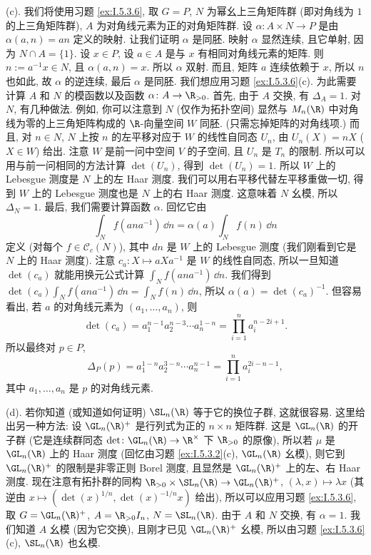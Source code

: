 \begin{solution}
(c). 我们将使用习题 \ref{ex:I.5.3.6}, 取 $G = P$, $N$ 为幂幺上三角矩阵群 (即对角线为 $1$ 的上三角矩阵群), $A$ 为对角线元素为正的对角矩阵群. 设 $\alpha \colon A \times N \to P$ 是由 $\alpha(a, n) = an$ 定义的映射. 让我们证明 $\alpha$ 是同胚. 映射 $\alpha$ 显然连续, 且它单射, 因为 $N \cap A = \{1\}$. 设 $x \in P$, 设 $a \in A$ 是与 $x$ 有相同对角线元素的矩阵. 则 $n := a^{-1}x \in N$, 且 $\alpha(a, n) = x$. 所以 $\alpha$ 双射. 而且, 矩阵 $a$ 连续依赖于 $x$, 所以 $n$ 也如此, 故 $\alpha$ 的逆连续, 最后 $\alpha$ 是同胚.
我们想应用习题 \ref{ex:I.5.3.6}(c). 为此需要计算 $A$ 和 $N$ 的模函数以及函数 $\alpha \colon A \to \R_{>0}$.
首先, 由于 $A$ 交换, 有 $\Delta_A = 1$.
对 $N$, 有几种做法. 例如, 你可以注意到 $N$ (仅作为拓扑空间) 显然与 $M_n(\R)$ 中对角线为零的上三角矩阵构成的 $\R$-向量空间 $W$ 同胚. (只需忘掉矩阵的对角线项.) 而且, 对 $n \in N$, $N$ 上按 $n$ 的左平移对应于 $W$ 的线性自同态 $U_n$, 由 $U_n(X) = nX$ ($X \in W$) 给出. 注意 $W$ 是前一问中空间 $V$ 的子空间, 且 $U_n$ 是 $T_n$ 的限制. 所以可以用与前一问相同的方法计算 $\det(U_n)$, 得到 $\det(U_n) = 1$.
所以 $W$ 上的 Lebesgue 测度是 $N$ 上的左 Haar 测度. 我们可以用右平移代替左平移重做一切, 得到 $W$ 上的 Lebesgue 测度也是 $N$ 上的右 Haar 测度. 这意味着 $N$ 幺模, 所以 $\Delta_N = 1$.
最后, 我们需要计算函数 $\alpha$. 回忆它由
\[
\int_N f(ana^{-1})\,\dd n = \alpha(a)\int_N f(n)\,\dd n
\]
定义 (对每个 $f \in \mathcal{C}_c(N)$), 其中 $dn$ 是 $W$ 上的 Lebesgue 测度 (我们刚看到它是 $N$ 上的 Haar 测度). 注意 $c_a \colon X \longmapsto aXa^{-1}$ 是 $W$ 的线性自同态, 所以一旦知道 $\det(c_a)$ 就能用换元公式计算 $\int_N f(ana^{-1})\,\dd n$. 我们得到 $\det(c_a)\int_N f(ana^{-1})\,\dd n = \int_N f(n)\,\dd n$, 所以 $\alpha(a) = \det(c_a)^{-1}$. 但容易看出, 若 $a$ 的对角线元素为 $(a_1, \ldots, a_n)$, 则
\[
\det(c_a) = a_1^{n-1}a_2^{n-3}\cdots a_n^{1-n} = \prod_{i=1}^n a_i^{n-2i+1}.
\]
所以最终对 $p \in P$,
\[
\Delta_P(p) = a_1^{1-n}a_2^{3-n}\cdots a_n^{n-1} = \prod_{i=1}^n a_i^{2i-n-1},
\]
其中 $a_1, \ldots, a_n$ 是 $p$ 的对角线元素.

(d). 若你知道 (或知道如何证明) $\SL_n(\R)$ 等于它的换位子群, 这就很容易. 这里给出另一种方法: 设 $\GL_n(\R)^+$ 是行列式为正的 $n \times n$ 矩阵群. 这是 $\GL_n(\R)$ 的开子群 (它是连续群同态 $\det \colon \GL_n(\R) \to \R^{\times}$ 下 $\R_{>0}$ 的原像), 所以若 $\mu$ 是 $\GL_n(\R)$ 上的 Haar 测度 (回忆由习题 \ref{ex:I.5.3.2}(c), $\GL_n(\R)$ 幺模), 则它到 $\GL_n(\R)^+$ 的限制是非零正则 Borel 测度, 且显然是 $\GL_n(\R)^+$ 上的左、右 Haar 测度. 现在注意有拓扑群的同构 $\R_{>0} \times \SL_n(\R) \to \GL_n(\R)^+$, $(\lambda, x) \longmapsto \lambda x$ (其逆由 $x \longmapsto (\det(x)^{1/n}, \det(x)^{-1/n}x)$ 给出), 所以可以应用习题 \ref{ex:I.5.3.6}, 取 $G = \GL_n(\R)^+$, $A = \R_{>0}I_n$, $N = \SL_n(\R)$. 由于 $A$ 和 $N$ 交换, 有 $\alpha = 1$. 我们知道 $A$ 幺模 (因为它交换), 且刚才已见 $\GL_n(\R)^+$ 幺模, 所以由习题 \ref{ex:I.5.3.6}(c), $\SL_n(\R)$ 也幺模.


\end{solution}

